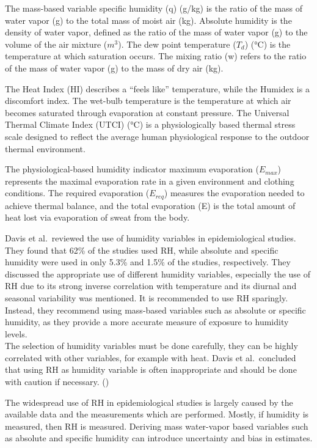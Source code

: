 \documentclass[
]{krantz}
\begin{document}
The mass-based variable specific humidity (q) (g/kg) is the ratio of the mass of water vapor (g) to the total mass of moist air (kg). Absolute humidity is the density of water vapor, defined as the ratio of the mass of water vapor (g) to the volume of the air mixture (\(m^3\)). The dew point temperature (\(T_d\)) (°C) is the temperature at which saturation occurs. The mixing ratio (w) refers to the ratio of the mass of water vapor (g) to the mass of dry air (kg).

The Heat Index (HI) describes a ``feels like'' temperature, while the Humidex is a discomfort index. The wet-bulb temperature is the temperature at which air becomes saturated through evaporation at constant pressure. The Universal Thermal Climate Index (UTCI) (°C) is a physiologically based thermal stress scale designed to reflect the average human physiological response to the outdoor thermal environment.

The physiological-based humidity indicator maximum evaporation (\(E_{max}\)) represents the maximal evaporation rate in a given environment and clothing conditions. The required evaporation (\(E_{req}\)) measures the evaporation needed to achieve thermal balance, and the total evaporation (E) is the total amount of heat lost via evaporation of sweat from the body.

Davis et al.~reviewed the use of humidity variables in epidemiological studies. They found that 62\% of the studies used RH, while absolute and specific humidity were used in only 5.3\% and 1.5\% of the studies, respectively. They discussed the appropriate use of different humidity variables, especially the use of RH due to its strong inverse correlation with temperature and its diurnal and seasonal variability was mentioned. It is recommended to use RH sparingly. Instead, they recommend using mass-based variables such as absolute or specific humidity, as they provide a more accurate measure of exposure to humidity levels.\\
The selection of humidity variables must be done carefully, they can be highly correlated with other variables, for example with heat. Davis et al.~concluded that using RH as humidity variable is often inappropriate and should be done with caution if necessary. (\citet{davis})

The widespread use of RH in epidemiological studies is largely caused by the available data and the measurements which are performed. Mostly, if humidity is measured, then RH is measured. Deriving mass water-vapor based variables such as absolute and specific humidity can introduce uncertainty and bias in estimates.
\end{document}
